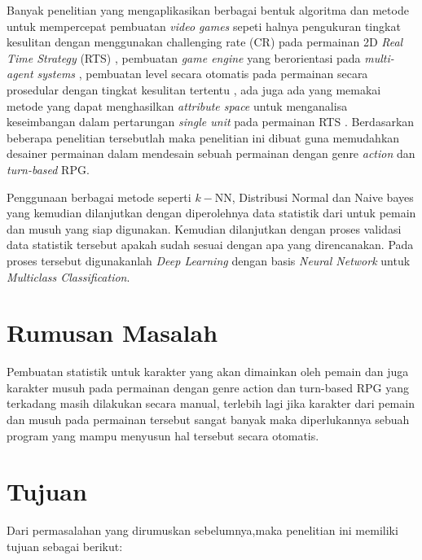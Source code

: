 Banyak penelitian yang mengaplikasikan berbagai bentuk algoritma dan metode untuk mempercepat pembuatan \textit{video games} sepeti halnya pengukuran tingkat kesulitan dengan menggunakan challenging rate (CR) pada permainan 2D \textit{Real Time Strategy} (RTS) \citep{Christyowidiasmoro2016}, pembuatan \textit{game engine} yang berorientasi pada \textit{multi-agent systems} \citep{Marin-Lora2020}, pembuatan level secara otomatis pada permainan secara prosedular dengan tingkat kesulitan tertentu \citep{Wu2018}, ada juga ada yang memakai metode yang dapat menghasilkan \textit{attribute space} untuk menganalisa keseimbangan dalam pertarungan \textit{single unit} pada permainan RTS \citep{Bangay2014}. Berdasarkan beberapa penelitian tersebutlah maka penelitian ini dibuat guna memudahkan desainer permainan dalam mendesain sebuah permainan dengan genre \textit{action} dan \textit{turn-based} RPG.
\vspace{1ex}

Penggunaan berbagai metode seperti $k-$NN, Distribusi Normal dan Naive bayes yang kemudian dilanjutkan dengan diperolehnya data statistik dari untuk pemain dan musuh yang siap digunakan. Kemudian dilanjutkan dengan proses validasi data statistik tersebut apakah sudah sesuai dengan apa yang direncanakan. Pada proses tersebut digunakanlah \textit{Deep Learning} dengan basis \textit{Neural Network} untuk \textit{Multiclass Classification}.
\vspace{1ex}

\section{Rumusan Masalah}
\vspace{1ex}

Pembuatan statistik untuk karakter yang akan dimainkan oleh pemain dan juga karakter musuh pada permainan dengan genre action dan turn-based RPG yang terkadang masih dilakukan secara manual, terlebih lagi jika karakter dari pemain dan musuh pada permainan tersebut sangat banyak maka diperlukannya sebuah program yang mampu menyusun hal tersebut secara otomatis.
\vspace{1ex}

\section{Tujuan}
\vspace{1ex}

Dari permasalahan yang dirumuskan sebelumnya,maka penelitian ini memiliki tujuan sebagai berikut: 

